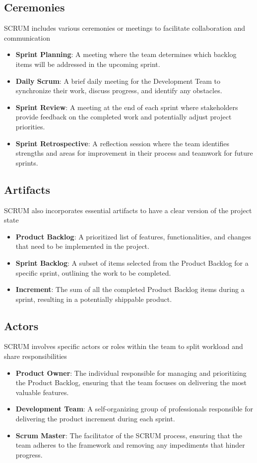 \subsection{Ceremonies}
SCRUM includes various ceremonies or meetings to facilitate collaboration and communication
\begin{itemize}
\item \textbf{Sprint Planning}: A meeting where the team determines which backlog items will be addressed in the upcoming sprint.
\item \textbf{Daily Scrum}: A brief daily meeting for the Development Team to synchronize their work, discuss progress, and identify any obstacles.
\item \textbf{Sprint Review}: A meeting at the end of each sprint where stakeholders provide feedback on the completed work and potentially adjust project priorities.
\item \textbf{Sprint Retrospective}: A reflection session where the team identifies strengths and areas for improvement in their process and teamwork for future sprints.
\end{itemize}
\subsection{Artifacts}

SCRUM also incorporates essential artifacts to have a clear version of the project state
\begin{itemize}
\item \textbf{Product Backlog}: A prioritized list of features, functionalities, and changes that need to be implemented in the project.
\item \textbf{Sprint Backlog}: A subset of items selected from the Product Backlog for a specific sprint, outlining the work to be completed.
\item \textbf{Increment}: The sum of all the completed Product Backlog items during a sprint, resulting in a potentially shippable product.
\end{itemize}

\subsection{Actors}
SCRUM involves specific actors or roles within the team to split workload and share responsibilities 
\begin{itemize}
\item \textbf{Product Owner}: The individual responsible for managing and prioritizing the Product Backlog, ensuring that the team focuses on delivering the most valuable features.
\item \textbf{Development Team}: A self-organizing group of professionals responsible for delivering the product increment during each sprint.
\item \textbf{Scrum Master}: The facilitator of the SCRUM process, ensuring that the team adheres to the framework and removing any impediments that hinder progress.
\end{itemize}
\vspace{0.5cm}

